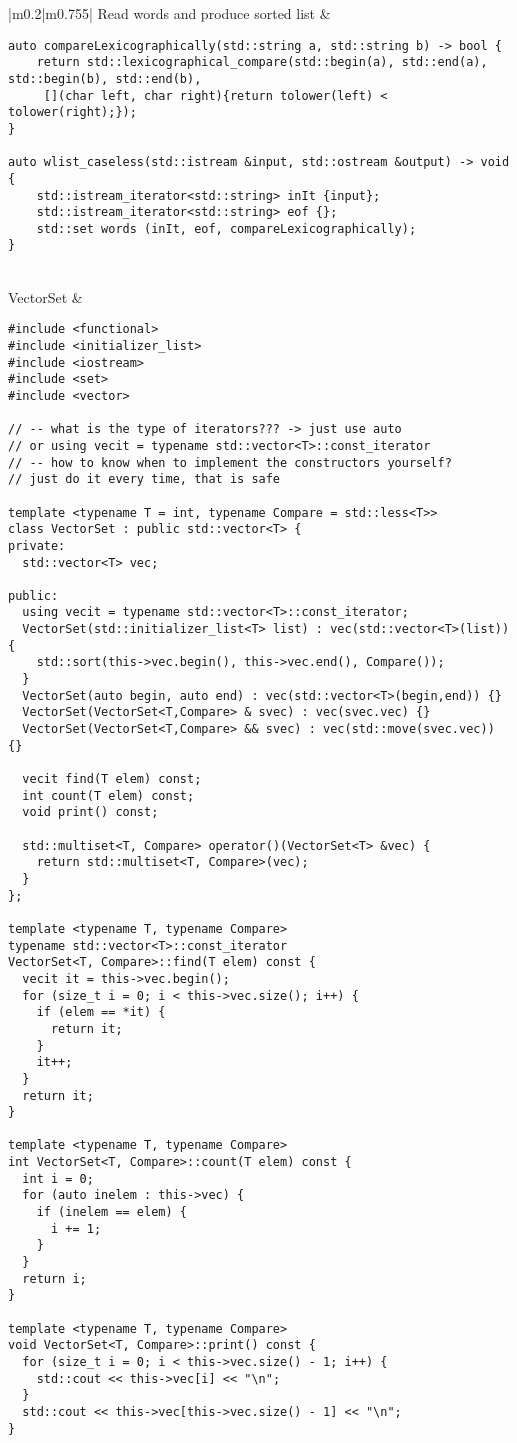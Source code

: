 \documentclass[main.tex,fontsize=8pt,paper=a4,paper=portrait,DIV=calc,]{scrartcl}
\begin{document}
\begin{table}[ht!]
\begin{tabular}{|m{0.2\linewidth}|m{0.755\linewidth}|}
\hline
Read words and produce sorted list & 
\begin{lstlisting}
auto compareLexicographically(std::string a, std::string b) -> bool {
    return std::lexicographical_compare(std::begin(a), std::end(a), std::begin(b), std::end(b),
     [](char left, char right){return tolower(left) < tolower(right);});
}

auto wlist_caseless(std::istream &input, std::ostream &output) -> void {
    std::istream_iterator<std::string> inIt {input};
    std::istream_iterator<std::string> eof {};
    std::set words (inIt, eof, compareLexicographically);
}
\end{lstlisting}
\\
\hline
VectorSet & 
\vspace{2mm}
\begin{lstlisting}
#include <functional>
#include <initializer_list>
#include <iostream>
#include <set>
#include <vector>

// -- what is the type of iterators??? -> just use auto
// or using vecit = typename std::vector<T>::const_iterator
// -- how to know when to implement the constructors yourself?
// just do it every time, that is safe

template <typename T = int, typename Compare = std::less<T>>
class VectorSet : public std::vector<T> {
private:
  std::vector<T> vec;

public:
  using vecit = typename std::vector<T>::const_iterator;
  VectorSet(std::initializer_list<T> list) : vec(std::vector<T>(list)) {
    std::sort(this->vec.begin(), this->vec.end(), Compare());
  }
  VectorSet(auto begin, auto end) : vec(std::vector<T>(begin,end)) {}
  VectorSet(VectorSet<T,Compare> & svec) : vec(svec.vec) {}
  VectorSet(VectorSet<T,Compare> && svec) : vec(std::move(svec.vec)) {}

  vecit find(T elem) const;
  int count(T elem) const;
  void print() const;

  std::multiset<T, Compare> operator()(VectorSet<T> &vec) {
    return std::multiset<T, Compare>(vec);
  }
};

template <typename T, typename Compare>
typename std::vector<T>::const_iterator
VectorSet<T, Compare>::find(T elem) const {
  vecit it = this->vec.begin();
  for (size_t i = 0; i < this->vec.size(); i++) {
    if (elem == *it) {
      return it;
    }
    it++;
  }
  return it;
}

template <typename T, typename Compare>
int VectorSet<T, Compare>::count(T elem) const {
  int i = 0;
  for (auto inelem : this->vec) {
    if (inelem == elem) {
      i += 1;
    }
  }
  return i;
}

template <typename T, typename Compare>
void VectorSet<T, Compare>::print() const {
  for (size_t i = 0; i < this->vec.size() - 1; i++) {
    std::cout << this->vec[i] << "\n";
  }
  std::cout << this->vec[this->vec.size() - 1] << "\n";
}
\end{lstlisting}
\\
\hline
\end{tabular}
\end{table}
\end{document}
